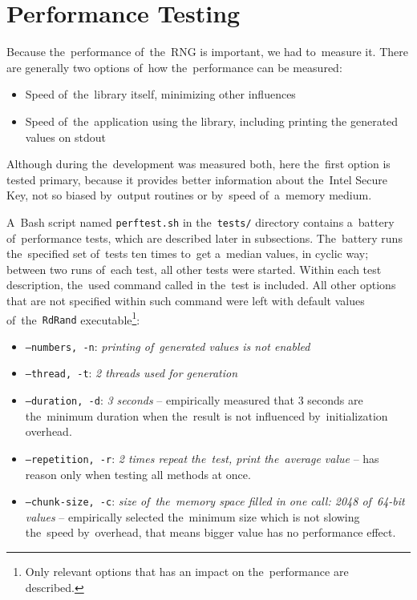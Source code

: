 \section{Performance Testing} \label{sec:testing:performance-testing}
\par{
Because the~performance of~the~RNG is important, we had to~measure it. There are generally two options of~how the~performance can be measured:
\begin{itemize}
 \item Speed of~the~library itself, minimizing other influences
 \item Speed of~the~application using the library, including printing the generated values on stdout
\end{itemize}
Although during the~development was measured both, here the~first option is tested primary, because it provides better information about the~Intel Secure Key, not so biased by~output routines or by~speed of~a~memory medium. 
}

\par{
A~Bash script named {\tt perftest.sh} in the~{\tt tests/} directory contains a~battery of~performance tests, which are described later in subsections. The~battery runs the~specified set of~tests ten times to~get a~median values, in cyclic way; between two runs of~each test, all other tests were started. Within each test description, the~used command called in the~test is included. All other options that are not specified within such command were left with default values of~the~{\tt RdRand} executable\footnote{Only relevant options that has an impact on the~performance are described.}:
}

\begin{itemize}
 \item {\tt --numbers, -n}: {\em printing of~generated values is not enabled}
 \item {\tt --thread, -t}: {\em 2 threads used for generation}
 \item {\tt --duration, -d}: {\em 3 seconds} -- empirically measured that 3 seconds are the~minimum duration when the~result is not influenced by~initialization overhead.
 \item {\tt --repetition, -r}: {\em 2 times repeat the~test, print the~average value} -- has reason only when testing all methods at once.
 \item {\tt --chunk-size, -c}: {\em size of~the~memory space filled in one call: 2048 of~64-bit values} -- empirically selected the~minimum size which is not slowing the~speed by~overhead, that means bigger value has no performance effect.
\end{itemize}

